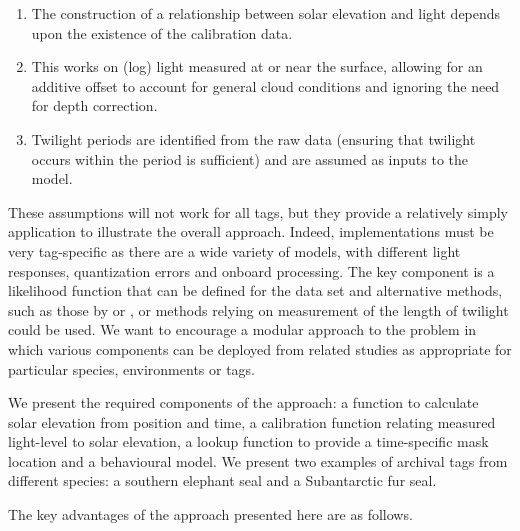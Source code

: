 \documentclass[10pt]{article}
\begin{document}
\begin{enumerate}
\item{The construction of a relationship between solar elevation and
    light depends upon the existence of the calibration
    data.} \item{This works on (log) light measured at or near the
    surface, allowing for an additive offset to account for general
    cloud conditions and ignoring the need for depth
    correction.}\item{Twilight periods are identified from the raw
    data (ensuring that twilight occurs within the period is
    sufficient) and are assumed as inputs to the model.}
\end{enumerate}


These assumptions will not work for all tags, but they provide a
relatively simply application to illustrate the overall approach.
Indeed, implementations must be very tag-specific as there are a wide
variety of models, with different light responses, quantization errors
and onboard processing.  The key component is a likelihood function
that can be defined for the data set and alternative methods, such as
those by \cite{Ekstrom2007} or \cite{sibert2007sml}, or methods
relying on measurement of the length of twilight could be used. We
want to encourage a modular approach to the problem in which various
components can be deployed from related studies as appropriate for
particular species, environments or tags.


We present the required components of the approach: a function to
calculate solar elevation from position and time, a calibration
function relating measured light-level to solar elevation, a lookup
function to provide a time-specific mask location and a behavioural
model. We present two examples of archival tags from different
species: a southern elephant seal and a Subantarctic fur seal.

The key advantages of the approach presented here are as follows.
\end{document}
